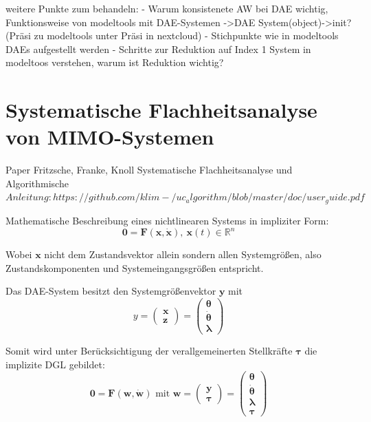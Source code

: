 weitere Punkte zum behandeln:
- Warum konsistenete AW bei DAE wichtig, Funktionsweise von modeltools mit DAE-Systemen ->DAE System(object)->init? (Präsi zu modeltools unter Präsi in nextcloud)
- Stichpunkte wie in modeltools DAEs aufgestellt werden
- Schritte zur Reduktion auf Index 1 System in modeltoos verstehen, warum ist Reduktion wichtig?

\section{Systematische Flachheitsanalyse von MIMO-Systemen}
Paper Fritzsche, Franke, Knoll Systematische Flachheitsanalyse und Algorithmische $Anleitung: https://github.com/klim-/uc_algorithm/blob/master/doc/user_guide.pdf$

Mathematische Beschreibung eines nichtlinearen Systems in impliziter Form:
\begin{equation}\label{eq:flatness_implicit_ode}
	\pmb{0} = \pmb{F}(\pmb{x}, \pmb{\dot{x}}), \ \pmb{x}(t) \in \mathbb{R}^n
\end{equation}

Wobei $\pmb{x}$ nicht dem Zustandsvektor allein sondern allen Systemgrößen, also Zustandskomponenten und Systemeingangsgrößen entspricht.

Das DAE-System besitzt den Systemgrößenvektor $\pmb{y}$ mit
\begin{equation}
	y
	=
	\begin{pmatrix}
		\pmb{x} \\
		\hline
		\pmb{z}
	\end{pmatrix}
	=
	\begin{pmatrix}
		\pmb{\theta} \\
		\pmb{\dot{\theta}} \\
		\hline
		\pmb{\lambda}
	\end{pmatrix}
\end{equation}

Somit wird unter Berücksichtigung der verallgemeinerten Stellkräfte $\pmb{\tau}$ die implizite DGL gebildet:
\begin{equation}
	\pmb{0} = \pmb{F(w, \dot{w})} \text{ mit } \pmb{w} 
	=
	\begin{pmatrix}
		\pmb{y} \\
		\hline
		\pmb{\tau}
	\end{pmatrix}
	= 
	\begin{pmatrix}
		\pmb{\theta} \\
		\pmb{\dot{\theta}} \\
		\pmb{\lambda} \\
		\hline
		\pmb{\tau}
	\end{pmatrix}
\end{equation}

